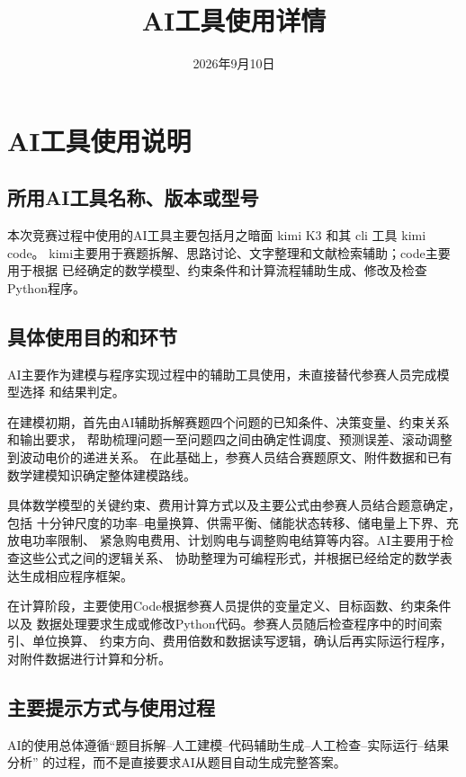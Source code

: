 \documentclass[withoutpreface,bwprint]{cumcmthesis}
\title{AI工具使用详情}
\author{}
\date{2026年9月10日}
\begin{document}
\maketitle

\section{AI工具使用说明}

\subsection{所用AI工具名称、版本或型号}

本次竞赛过程中使用的AI工具主要包括月之暗面 kimi K3 和其 cli 工具 kimi code。
kimi主要用于赛题拆解、思路讨论、文字整理和文献检索辅助；code主要用于根据
已经确定的数学模型、约束条件和计算流程辅助生成、修改及检查Python程序。

\subsection{具体使用目的和环节}

AI主要作为建模与程序实现过程中的辅助工具使用，未直接替代参赛人员完成模型选择
和结果判定。

在建模初期，首先由AI辅助拆解赛题四个问题的已知条件、决策变量、约束关系和输出要求，
帮助梳理问题一至问题四之间由确定性调度、预测误差、滚动调整到波动电价的递进关系。
在此基础上，参赛人员结合赛题原文、附件数据和已有数学建模知识确定整体建模路线。

具体数学模型的关键约束、费用计算方式以及主要公式由参赛人员结合题意确定，包括
十分钟尺度的功率--电量换算、供需平衡、储能状态转移、储电量上下界、充放电功率限制、
紧急购电费用、计划购电与调整购电结算等内容。AI主要用于检查这些公式之间的逻辑关系、
协助整理为可编程形式，并根据已经给定的数学表达生成相应程序框架。

在计算阶段，主要使用Code根据参赛人员提供的变量定义、目标函数、约束条件以及
数据处理要求生成或修改Python代码。参赛人员随后检查程序中的时间索引、单位换算、
约束方向、费用倍数和数据读写逻辑，确认后再实际运行程序，对附件数据进行计算和分析。

\subsection{主要提示方式与使用过程}

AI的使用总体遵循``题目拆解--人工建模--代码辅助生成--人工检查--实际运行--结果分析''
的过程，而不是直接要求AI从题目自动生成完整答案。
\end{document}
